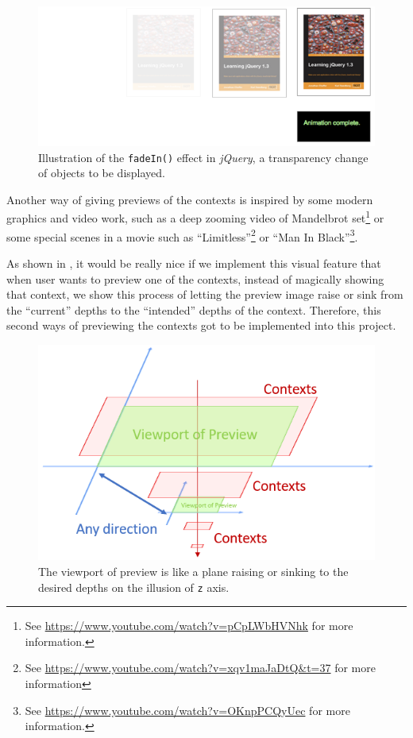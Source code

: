 \begin{figure}[H]
\centering
\includegraphics[width=\textwidth,keepaspectratio]{Figures/Chapter1/jqfadein.png}
\decoRule
\caption[Fade-in Effect in jQuery]{Illustration of the \texttt{fadeIn()} effect in \emph{jQuery}, a transparency change of objects to be displayed.}
\label{fig:jqfadein}
\end{figure}

Another way of giving previews of the contexts is inspired by some modern graphics and video work, such as a deep zooming video of Mandelbrot set\footnote{ See \url{https://www.youtube.com/watch?v=pCpLWbHVNhk} for more information.} or some special scenes in a movie such as ``Limitless''\footnote{ See \url{https://www.youtube.com/watch?v=xqv1maJaDtQ&t=37} for more information} or ``Man In Black''\footnote{ See \url{https://www.youtube.com/watch?v=OKnpPCQyUec} for more information.}.

As shown in , it would be really nice if we implement this visual feature that when user wants to preview one of the contexts, instead of magically showing that context, we show this process of letting the preview image raise or sink from the ``current'' depths to the ``intended'' depths of the context. Therefore, this second ways of previewing the contexts got to be implemented into this project.

\begin{figure}[H]
\centering
\includegraphics[width=.8\textwidth,keepaspectratio]{Figures/Chapter1/zoompreview.png}
\decoRule
\caption[Moving Preview Plane on Context Views]{The viewport of preview is like a plane raising or sinking to the desired depths on the illusion of \texttt{z} axis.}
\label{fig:zoompreview}
\end{figure}

